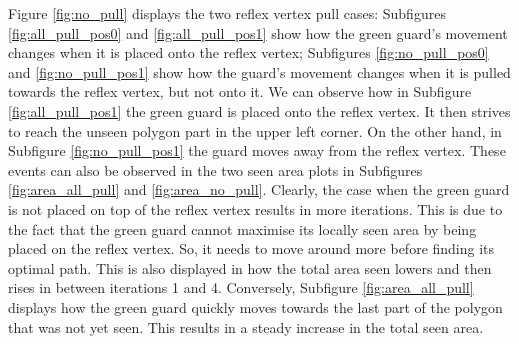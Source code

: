 Figure \ref{fig:no_pull} displays the two reflex vertex pull cases: Subfigures \ref{fig:all_pull_pos0} and \ref{fig:all_pull_pos1} show how the green guard's movement changes when it is placed onto the reflex vertex; Subfigures \ref{fig:no_pull_pos0} and \ref{fig:no_pull_pos1} show how the guard's movement changes when it is pulled towards the reflex vertex, but not onto it. We can observe how in Subfigure \ref{fig:all_pull_pos1} the green guard is placed onto the reflex vertex. It then strives to reach the unseen polygon part in the upper left corner. On the other hand, in Subfigure \ref{fig:no_pull_pos1} the guard moves away from the reflex vertex. 
These events can also be observed in the two seen area plots in Subfigures \ref{fig:area_all_pull} and \ref{fig:area_no_pull}. Clearly, the case when the green guard is not placed on top of the reflex vertex results in more iterations. This is due to the fact that the green guard cannot maximise its locally seen area by being placed on the reflex vertex. So, it needs to move around more before finding its optimal path. This is also displayed in how the total area seen lowers and then rises in between iterations 1 and 4. Conversely, Subfigure \ref{fig:area_all_pull} displays how the green guard quickly moves towards the last part of the polygon that was not yet seen. This results in a steady increase in the total seen area.

